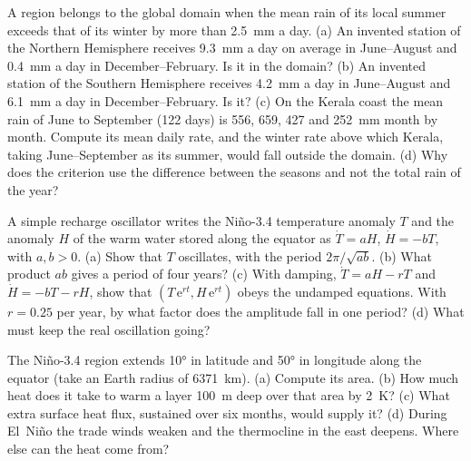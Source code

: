 \begin{exercise}[$\star\star$]\label{exo:b2:climate-variability:9}
A region belongs to the global  domain when the mean rain of its local summer exceeds that
of its winter by more than \qty{2.5}{mm} a day. (a) An invented station of the Northern
Hemisphere receives \qty{9.3}{mm} a day on average in June--August and \qty{0.4}{mm} a day in
December--February. Is it in the domain? (b) An invented station of the Southern Hemisphere
receives \qty{4.2}{mm} a day in June--August and \qty{6.1}{mm} a day in December--February. Is
it? (c) On the Kerala coast the mean rain of June to September (122 days) is 556, 659, 427 and
\qty{252}{mm} month by month. Compute its mean daily rate, and the winter rate above which Kerala,
taking June--September as its summer, would fall outside the domain. (d) Why does the criterion
use the difference between the seasons and not the total rain of the year?
\end{exercise}

\begin{exercise}[$\star\star\star$]\label{exo:b2:climate-variability:10}
A simple recharge oscillator writes the Niño-3.4 temperature anomaly $T$ and the anomaly $H$ of the
warm water stored along the equator as $\dot T = aH$, $\dot H = -bT$, with $a, b > 0$. (a) Show
that $T$ oscillates, with the period $2\pi/\sqrt{ab}$. (b) What product $ab$ gives a period of
four years? (c) With damping, $\dot T = aH - rT$ and $\dot H = -bT - rH$, show that
$(T\,\mathrm{e}^{rt}, H\,\mathrm{e}^{rt})$ obeys the undamped equations. With $r = 0.25$ per
year, by what factor does the amplitude fall in one period? (d) What must keep the real
oscillation going?
\end{exercise}

\begin{exercise}[$\star\star\star$]\label{exo:b2:climate-variability:11}
The Niño-3.4 region extends \ang{10} in latitude and \ang{50} in longitude along the equator
(take an Earth radius of \qty{6371}{km}). (a) Compute its area. (b) How much heat does it take to
warm a layer \qty{100}{m} deep over that area by \qty{2}{K}? (c) What extra surface heat flux,
sustained over six months, would supply it? (d) During El~Niño the trade winds weaken and the
thermocline in the east deepens. Where else can the heat come from?
\end{exercise}

